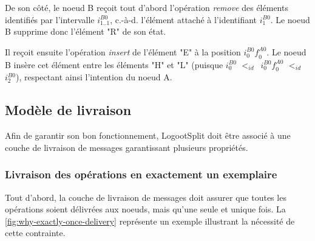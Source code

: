 \documentclass[12pt]{thesul}
\newcommand{\ie}{c.-à-d. }
\newcommand{\trm}[1]{\mathit{#1}}
\newcommand{\id}[3]{$\trm{#1}^{\trm{#2}}_{\trm{#3}}$}
\newcommand{\lid}{$<_{id}$~}
\begin{document}
De son côté, le noeud B reçoit tout d'abord l'opération \emph{remove} des éléments identifiés par l'intervalle \id{i}{B0}{1..1}, \ie l'élément attaché à l'identifiant \id{i}{B0}{1}.
Le noeud B supprime donc l'élément "R" de son état.

Il reçoit ensuite l'opération \emph{insert} de l'élément "E" à la position \id{i}{B0}{0}\id{f}{A0}{0}.
Le noeud B insère cet élément entre les éléments "H" et "L" (puisque \id{i}{B0}{0} \lid \id{i}{B0}{0}\id{f}{A0}{0} \lid \id{i}{B0}{2}), respectant ainsi l'intention du noeud A.


\subsection{Modèle de livraison}

\label{sec:logootsplit-delivery-model}

Afin de garantir son bon fonctionnement, LogootSplit doit être associé à une couche de livraison de messages garantissant plusieurs propriétés.

\subsubsection{Livraison des opérations en exactement un exemplaire}

Tout d'abord, la couche de livraison de messages doit assurer que toutes les opérations soient délivrées aux noeuds, mais qu'une seule et unique fois.
La \autoref{fig:why-exactly-once-delivery} représente un exemple illustrant la nécessité de cette contrainte.
\end{document}
